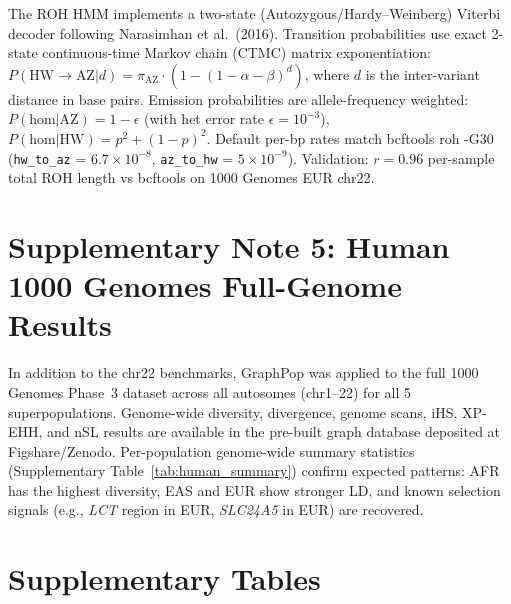 The ROH HMM implements a two-state (Autozygous/Hardy--Weinberg) Viterbi decoder following Narasimhan et al.\ (2016). Transition probabilities use exact 2-state continuous-time Markov chain (CTMC) matrix exponentiation: $P(\text{HW} \to \text{AZ}|d) = \pi_\text{AZ} \cdot (1 - (1-\alpha-\beta)^d)$, where $d$ is the inter-variant distance in base pairs. Emission probabilities are allele-frequency weighted: $P(\text{hom}|\text{AZ}) = 1 - \epsilon$ (with het error rate $\epsilon = 10^{-3}$), $P(\text{hom}|\text{HW}) = p^2 + (1-p)^2$. Default per-bp rates match bcftools roh -G30 (\texttt{hw\_to\_az} = $6.7 \times 10^{-8}$, \texttt{az\_to\_hw} = $5 \times 10^{-9}$). Validation: $r = 0.96$ per-sample total ROH length vs bcftools on 1000 Genomes EUR chr22.

\section{Supplementary Note 5: Human 1000 Genomes Full-Genome Results}

In addition to the chr22 benchmarks, GraphPop was applied to the full 1000 Genomes Phase~3 dataset across all autosomes (chr1--22) for all 5 superpopulations. Genome-wide diversity, divergence, genome scans, iHS, XP-EHH, and nSL results are available in the pre-built graph database deposited at Figshare/Zenodo. Per-population genome-wide summary statistics (Supplementary Table~\ref{tab:human_summary}) confirm expected patterns: AFR has the highest diversity, EAS and EUR show stronger LD, and known selection signals (e.g., \emph{LCT} region in EUR, \emph{SLC24A5} in EUR) are recovered.


\section{Supplementary Tables}

